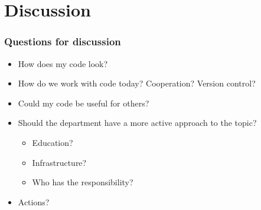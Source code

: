 \section{Discussion}
\begin{frame}
	\frametitle{Questions for discussion}
	\begin{itemize}
		\item How does my code look?
		\item How do we work with code today? Cooperation? Version control?
		\item Could my code be useful for others?
		\item Should the department have a more active approach to the topic?
	\begin{itemize}
		\item Education?
		\item Infrastructure?
		\item Who has the responsibility?
	\end{itemize}
	\item Actions?
	\end{itemize}
\end{frame}
